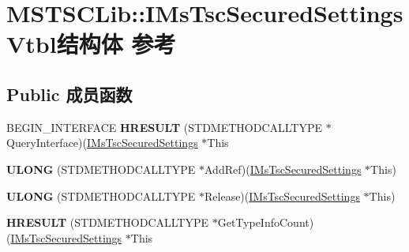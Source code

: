 \hypertarget{struct_m_s_t_s_c_lib_1_1_i_ms_tsc_secured_settings_vtbl}{}\section{M\+S\+T\+S\+C\+Lib\+:\+:I\+Ms\+Tsc\+Secured\+Settings\+Vtbl结构体 参考}
\label{struct_m_s_t_s_c_lib_1_1_i_ms_tsc_secured_settings_vtbl}
\subsection*{Public 成员函数}
\begin{DoxyCompactItemize}
\item 
\mbox{\label{struct_m_s_t_s_c_lib_1_1_i_ms_tsc_secured_settings_vtbl_a917e4eee45cedf66e606e1e724474719}} 
B\+E\+G\+I\+N\+\_\+\+I\+N\+T\+E\+R\+F\+A\+CE {\bfseries H\+R\+E\+S\+U\+LT} (S\+T\+D\+M\+E\+T\+H\+O\+D\+C\+A\+L\+L\+T\+Y\+PE $\ast$Query\+Interface)(\hyperlink{interface_m_s_t_s_c_lib_1_1_i_ms_tsc_secured_settings}{I\+Ms\+Tsc\+Secured\+Settings} $\ast$This
\item 
\mbox{\label{struct_m_s_t_s_c_lib_1_1_i_ms_tsc_secured_settings_vtbl_a0cf478aa4d24eeaea44a2811dc0bf699}} 
{\bfseries U\+L\+O\+NG} (S\+T\+D\+M\+E\+T\+H\+O\+D\+C\+A\+L\+L\+T\+Y\+PE $\ast$Add\+Ref)(\hyperlink{interface_m_s_t_s_c_lib_1_1_i_ms_tsc_secured_settings}{I\+Ms\+Tsc\+Secured\+Settings} $\ast$This)
\item 
\mbox{\label{struct_m_s_t_s_c_lib_1_1_i_ms_tsc_secured_settings_vtbl_a11a99ce8780906eaa47d7bcfb29dff5c}} 
{\bfseries U\+L\+O\+NG} (S\+T\+D\+M\+E\+T\+H\+O\+D\+C\+A\+L\+L\+T\+Y\+PE $\ast$Release)(\hyperlink{interface_m_s_t_s_c_lib_1_1_i_ms_tsc_secured_settings}{I\+Ms\+Tsc\+Secured\+Settings} $\ast$This)
\item 
\mbox{\label{struct_m_s_t_s_c_lib_1_1_i_ms_tsc_secured_settings_vtbl_aed4ab2c347f81fa0707e8e48d735647c}} 
{\bfseries H\+R\+E\+S\+U\+LT} (S\+T\+D\+M\+E\+T\+H\+O\+D\+C\+A\+L\+L\+T\+Y\+PE $\ast$Get\+Type\+Info\+Count)(\hyperlink{interface_m_s_t_s_c_lib_1_1_i_ms_tsc_secured_settings}{I\+Ms\+Tsc\+Secured\+Settings} $\ast$This

\end{DoxyCompactItemize}
